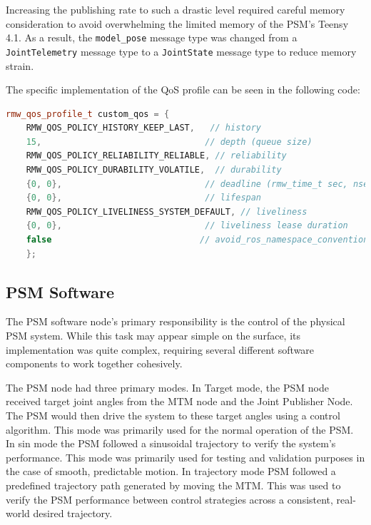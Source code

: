 Increasing the publishing rate to such a drastic level required careful memory consideration to avoid overwhelming the limited memory of the PSM's Teensy 4.1. As a result, the \texttt{model\_pose} message type was changed from a \texttt{JointTelemetry} message type to a \texttt{JointState} message type to reduce memory strain.

The specific implementation of the QoS profile can be seen in the following code:

\begin{lstlisting}[language=C++, caption={Custom QoS Profile Definition}, label={lst:custom_qos_profile}]
    rmw_qos_profile_t custom_qos = {
    RMW_QOS_POLICY_HISTORY_KEEP_LAST,   // history
    15,                                // depth (queue size)
    RMW_QOS_POLICY_RELIABILITY_RELIABLE, // reliability
    RMW_QOS_POLICY_DURABILITY_VOLATILE,  // durability
    {0, 0},                            // deadline (rmw_time_t sec, nsec)
    {0, 0},                            // lifespan
    RMW_QOS_POLICY_LIVELINESS_SYSTEM_DEFAULT, // liveliness
    {0, 0},                            // liveliness lease duration
    false                             // avoid_ros_namespace_conventions
    };
\end{lstlisting}

\subsection{PSM Software}

The PSM software node's primary responsibility is the control of the physical PSM system. While this task may appear simple on the surface, its implementation was quite complex, requiring several different software components to work together cohesively.

The PSM node had three primary modes. In Target mode, the PSM node received target joint angles from the MTM node and the Joint Publisher Node. The PSM would then drive the system to these target angles using a control algorithm. This mode was primarily used for the normal operation of the PSM. In sin mode the PSM followed a sinusoidal trajectory to verify the system's performance. This mode was primarily used for testing and validation purposes in the case of smooth, predictable motion. In trajectory mode PSM followed a predefined trajectory path generated by moving the MTM. This was used to verify the PSM performance between control strategies across a consistent, real-world desired trajectory.



